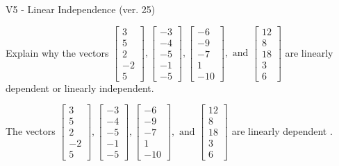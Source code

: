 \begin{exercise}
  \begin{exerciseTitle}V5 - Linear Independence (ver. 25)\end{exerciseTitle}
  \begin{exerciseStatement}
    Explain why the vectors \(\left[\begin{array}{r}
3 \\
5 \\
2 \\
-2 \\
5
\end{array}\right] , \left[\begin{array}{r}
-3 \\
-4 \\
-5 \\
-1 \\
-5
\end{array}\right] , \left[\begin{array}{r}
-6 \\
-9 \\
-7 \\
1 \\
-10
\end{array}\right] , \text{ and } \left[\begin{array}{r}
12 \\
8 \\
18 \\
3 \\
6
\end{array}\right]\) are linearly dependent or linearly independent.	


  \end{exerciseStatement}
  \begin{exerciseAnswer}
   The vectors \(\left[\begin{array}{r}
3 \\
5 \\
2 \\
-2 \\
5
\end{array}\right] , \left[\begin{array}{r}
-3 \\
-4 \\
-5 \\
-1 \\
-5
\end{array}\right] , \left[\begin{array}{r}
-6 \\
-9 \\
-7 \\
1 \\
-10
\end{array}\right] , \text{ and } \left[\begin{array}{r}
12 \\
8 \\
18 \\
3 \\
6
\end{array}\right]\) are 
  	 linearly dependent  .
  


  \end{exerciseAnswer}
\end{exercise}
